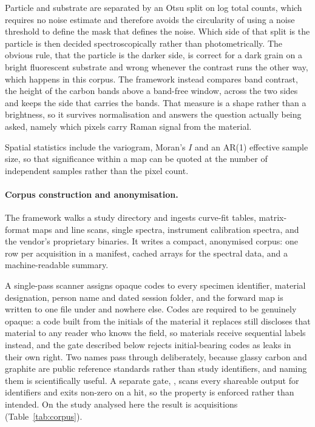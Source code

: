 \label{sec:masking}Particle and substrate are separated by an Otsu split on log
total counts, which requires no noise estimate and therefore avoids the
circularity of using a noise threshold to define the mask that defines the
noise. Which side of that split is the particle is then decided
spectroscopically rather than photometrically. The obvious rule, that the
particle is the darker side, is correct for a dark grain on a bright
fluorescent substrate and wrong whenever the contrast runs the other way, which
happens in this corpus. The framework instead compares band contrast, the
height of the carbon bands above a band-free window, across the two sides and
keeps the side that carries the bands. That measure is a shape rather than a
brightness, so it survives normalisation and answers the question actually
being asked, namely which pixels carry Raman signal from the material.

Spatial statistics include the variogram, Moran's $I$ and an
AR(1) effective sample size, so that significance within a map can be quoted at
the number of independent samples rather than the pixel count.

\paragraph{Corpus construction and anonymisation.}
The framework walks a study directory and ingests curve-fit tables,
matrix-format maps and line scans, single spectra, instrument calibration
spectra, and the vendor's proprietary binaries. It writes a compact,
anonymised corpus: one row per acquisition in a manifest, cached arrays for
the spectral data, and a machine-readable summary.

A single-pass scanner assigns opaque codes to every specimen identifier,
material designation, person name and dated session folder, and the forward map
is written to one file under  and nowhere else. Codes are
required to be genuinely opaque: a code built from the initials of the material
it replaces still discloses that material to any reader who knows the field, so
materials receive sequential labels instead, and the gate described below
rejects initial-bearing codes as leaks in their own right. Two names pass through deliberately,
because glassy carbon and graphite are public reference standards rather than
study identifiers, and naming them is scientifically useful. A separate gate,
, scans every shareable output for identifiers
and exits non-zero on a hit, so the property is enforced rather than intended.
On the study analysed here the result is \Nacq{} acquisitions
(Table~\ref{tab:corpus}).

